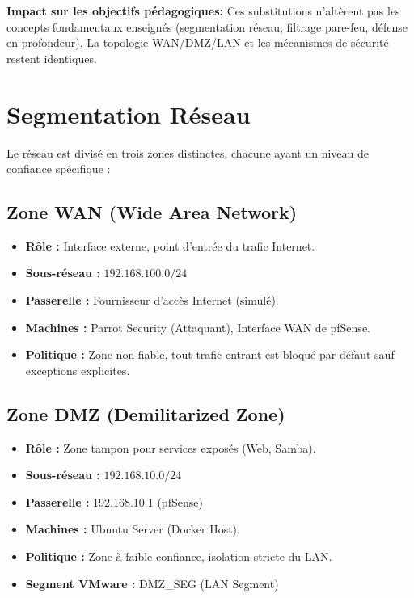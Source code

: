 \documentclass[12pt,a4paper,openany]{report}
\begin{document}
	\textbf{Impact sur les objectifs pédagogiques:} Ces substitutions 
	n'altèrent pas les concepts fondamentaux enseignés (segmentation réseau, 
	filtrage pare-feu, défense en profondeur). La topologie WAN/DMZ/LAN 
	et les mécanismes de sécurité restent identiques.
	
	
	\section{Segmentation Réseau}
	Le réseau est divisé en trois zones distinctes, chacune ayant un niveau de confiance spécifique :
	
	\subsection{Zone WAN (Wide Area Network)}
	\begin{itemize}
		\item \textbf{Rôle :} Interface externe, point d'entrée du trafic Internet.
		\item \textbf{Sous-réseau :} $192.168.100.0/24$
		\item \textbf{Passerelle :} Fournisseur d'accès Internet (simulé).
		\item \textbf{Machines :} Parrot Security (Attaquant), Interface WAN de pfSense.
		\item \textbf{Politique :} Zone non fiable, tout trafic entrant est bloqué par défaut sauf exceptions explicites.
	\end{itemize}
	
	\subsection{Zone DMZ (Demilitarized Zone)}
	\begin{itemize}
		\item \textbf{Rôle :} Zone tampon pour services exposés (Web, Samba).
		\item \textbf{Sous-réseau :} $192.168.10.0/24$
		\item \textbf{Passerelle :} 192.168.10.1 (pfSense)
		\item \textbf{Machines :} Ubuntu Server (Docker Host).
		\item \textbf{Politique :} Zone à faible confiance, isolation stricte du LAN.
		\item \textbf{Segment VMware :} DMZ\_SEG (LAN Segment)  %
	\end{itemize}
	
\end{document}
